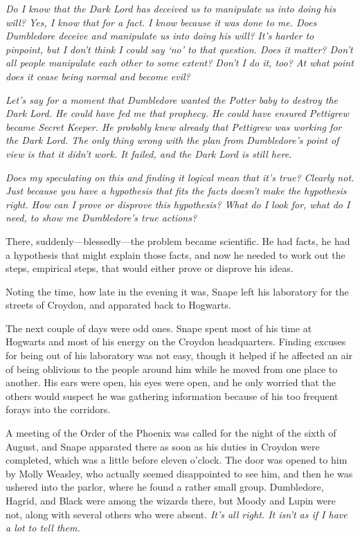 \emph{Do I know that the Dark Lord has deceived us to manipulate us into doing his will? Yes, I know that for a fact. I know because it was done to me. Does Dumbledore deceive and manipulate us into doing his will? It's harder to pinpoint, but I don't think I could say `no' to that question. Does it matter? Don't all people manipulate each other to some extent? Don't I do it, too? At what point does it cease being normal and become evil?}

\emph{Let's say for a moment that Dumbledore wanted the Potter baby to destroy the Dark Lord. He could have fed me that prophecy. He could have ensured Pettigrew became Secret Keeper. He probably knew already that Pettigrew was working for the Dark Lord. The only thing wrong with the plan from Dumbledore's point of view is that it didn't work. It failed, and the Dark Lord is still here.}

\emph{Does my speculating on this and finding it logical mean that it's true? Clearly not. Just because you have a hypothesis that fits the facts doesn't make the hypothesis right. How can I prove or disprove this hypothesis? What do I look for, what do I need, to show me Dumbledore's true actions?}

There, suddenly—blessedly—the problem became scientific. He had facts, he had a hypothesis that might explain those facts, and now he needed to work out the steps, empirical steps, that would either prove or disprove his ideas.

Noting the time, how late in the evening it was, Snape left his laboratory for the streets of Croydon, and apparated back to Hogwarts.

The next couple of days were odd ones. Snape spent most of his time at Hogwarts and most of his energy on the Croydon headquarters. Finding excuses for being out of his laboratory was not easy, though it helped if he affected an air of being oblivious to the people around him while he moved from one place to another. His ears were open, his eyes were open, and he only worried that the others would suspect he was gathering information because of his too frequent forays into the corridors.

A meeting of the Order of the Phoenix was called for the night of the sixth of August, and Snape apparated there as soon as his duties in Croydon were completed, which was a little before eleven o'clock. The door was opened to him by Molly Weasley, who actually seemed disappointed to see him, and then he was ushered into the parlor, where he found a rather small group. Dumbledore, Hagrid, and Black were among the wizards there, but Moody and Lupin were not, along with several others who were absent. \emph{It's all right. It isn't as if I have a lot to tell them.}

